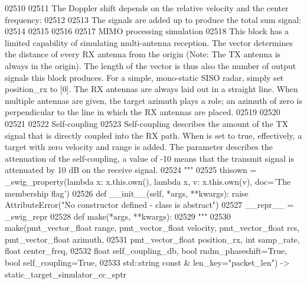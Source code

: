 \begin{DoxyCode}
{{{{{{{{{{02510 \textcolor{stringliteral}{}
02511 \textcolor{stringliteral}{    The Doppler shift  depends on the relative velocity and the center frequency: }
02512 \textcolor{stringliteral}{}
02513 \textcolor{stringliteral}{    The signals are added up to produce the total sum signal: }
02514 \textcolor{stringliteral}{}
02515 \textcolor{stringliteral}{}
02516 \textcolor{stringliteral}{}
02517 \textcolor{stringliteral}{    MIMO processing simulation}
02518 \textcolor{stringliteral}{    This block has a limited capability of simulating multi-antenna reception. The  vector determines the
       distance of every RX antenna from the origin (Note: The TX antenna is always in the origin). The length of
       the  vector is thus also the number of output signals this block produces. For a simple, mono-static SISO
       radar, simply set position\_rx to [0]. The RX antennas are always laid out in a straight line. When multiple
       antennas are given, the target azimuth plays a role; an azimuth of zero is perpendicular to the line in which
       the RX antennas are placed.}
02519 \textcolor{stringliteral}{}
02520 \textcolor{stringliteral}{}
02521 \textcolor{stringliteral}{}
02522 \textcolor{stringliteral}{    Self-coupling}
02523 \textcolor{stringliteral}{    Self-coupling describes the amount of the TX signal that is directly coupled into the RX path. When  is
       set to true, effectively, a target with zero velocity and range is added. The parameter  describes the
       attenuation of the self-coupling, a value of -10 means that the transmit signal is attenuated by 10 dB on the
       receive signal.}
02524 \textcolor{stringliteral}{    """}
02525     thisown = _swig_property(\textcolor{keyword}{lambda} x: x.this.own(), \textcolor{keyword}{lambda} x, v: x.this.own(v), doc=\textcolor{stringliteral}{'The membership flag'})
02526     \textcolor{keyword}{def }__init__(self, *args, **kwargs): \textcolor{keywordflow}{raise} AttributeError(\textcolor{stringliteral}{"No constructor defined - class is abstract"})
02527     \_\_repr\_\_ = \_swig\_repr
02528     \textcolor{keyword}{def }make(*args, **kwargs):
02529         \textcolor{stringliteral}{"""}
02530 \textcolor{stringliteral}{        make(pmt\_vector\_float range, pmt\_vector\_float velocity, pmt\_vector\_float rcs, pmt\_vector\_float
       azimuth, }
02531 \textcolor{stringliteral}{            pmt\_vector\_float position\_rx, int samp\_rate, float center\_freq, }
02532 \textcolor{stringliteral}{            float self\_coupling\_db, bool rndm\_phaseshift=True, bool self\_coupling=True, }
02533 \textcolor{stringliteral}{            std::string const & len\_key="packet\_len") -> static\_target\_simulator\_cc\_sptr}
}}}}}}}}}}
\end{DoxyCode}
